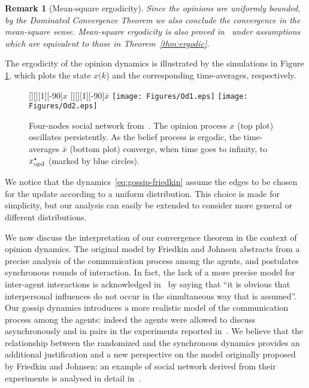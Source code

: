 \documentclass{IEEEtran}
\newtheorem{remark}{Remark}
\newcommand{\1}{\mathbf{1}} \newcommand{\ind}{\mathds{1}}
\begin{document}
\begin{remark}[Mean-square ergodicity]
Since the opinions are uniformly bounded, by the Dominated Convergence Theorem we  also conclude the convergence in the 
mean-square sense. Mean-square ergodicity is also proved in~\cite{PF-CR-RT-HI:13c} under assumptions which are equivalent to those in Theorem~\ref{thm:ergodic}.
\end{remark}
The ergodicity of the opinion dynamics is illustrated by the simulations in
Figure \ref{fig:simul-od}, which plots the state $x(k$) and the
corresponding time-averages, respectively.
\begin{figure}[t]
\begin{center}
[][][1][-90]{$x$}
[][][1][-90]{$\bar x$}
\texttt{[image: Figures/Od1.eps]}
\texttt{[image: Figures/Od2.eps]}
\caption{Four-nodes social network from~\cite{NEF-ECJ:99}. The opinion process
$x$ (top plot) oscillates persistently. As the belief process is ergodic, the time-averages $\bar x$ (bottom plot) converge, when time goes to
infinity, to ${x_{\textup{opd}}^{\star}}$ (marked by blue circles).}
\label{fig:simul-od}
\end{center}
\end{figure}

We notice that the dynamics~\eqref{eq:gossip-friedkin} assume the edges to be chosen for the update according to a uniform distribution. This choice is made for simplicity, but our analysis can easily be extended to consider more general or different distributions.


We now discuss the interpretation of our convergence theorem in the
context of opinion dynamics. The original model by Friedkin and Johnsen abstracts from a precise analysis of the communication process among the agents, and postulates synchronous rounds of interaction. In fact, the lack of a more precise model for inter-agent interactions is acknowledged in~\cite{NEF-ECJ:99} by saying that ``it is obvious that interpersonal influences do not occur in the simultaneous way that is assumed''.
Our gossip dynamics introduces a more realistic model of  the communication process among the agents: indeed the agents were allowed to discuss asynchronously and in pairs in the experiments reported in~\cite{NEF-ECJ:99}. 
We believe that the relationship between the randomized and the synchronous dynamics provides an additional justification and a new perspective on the model originally proposed by Friedkin and Johnsen: an example of social network derived from their experiments is analysed in detail in~\cite{PF-CR-RT-HI:13c}.
\end{document}
